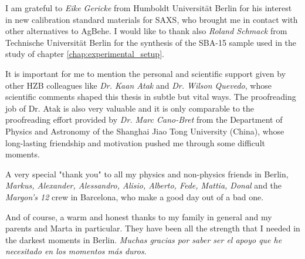 \noindent I am grateful to \emph{Eike Gericke} from Humboldt Universität Berlin for his interest in new calibration standard materials for SAXS, who brought me in contact with other alternatives to AgBehe. I would like to thank also \emph{Roland Schmack} from Technische Universität Berlin for the synthesis of the SBA-15 sample used in the study of chapter \ref{chap:experimental_setup}.
\vspace{2ex}

\noindent It is important for me to mention the personal and scientific support given by other HZB colleagues like \emph{Dr. Kaan Atak} and \emph{Dr. Wilson Quevedo}, whose scientific comments shaped this thesis in subtle but vital ways. The proofreading job of Dr. Atak is also very valuable and it is only comparable to the proofreading effort provided by \emph{Dr. Marc Cano-Bret} from the Department of Physics and Astronomy of the Shanghai Jiao Tong University (China), whose long-lasting friendship and motivation pushed me through some difficult moments.
\vspace{2ex}

\noindent A very special "thank you" to all my physics and non-physics friends in Berlin, \emph{Markus, Alexander, Alessandro, Alisio, Alberto, Fede, Mattia, Donal} and the \emph{Margon's 12} crew in Barcelona, who make a good day out of a bad one.
\vspace{2ex}

\noindent And of course, a warm and honest thanks to my family in general and my parents and Marta in particular. They have been all the strength that I needed in the darkest moments in Berlin. \emph{Muchas gracias por saber ser el apoyo que he necesitado en los momentos m\'{a}s duros}.

\cleardoublepage

